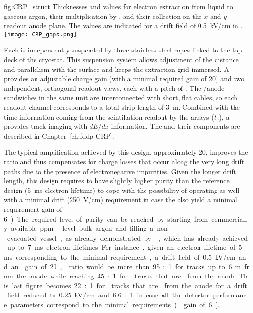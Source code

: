 \begin{dunefigure}{fig:CRP_struct}
{Thicknesses and  values for electron extraction from liquid to gaseous argon, their  multiplication by , and their collection on the $x$ and $y$ readout anode plane. The  values are indicated for a drift field of \SI{0.5}{kV/cm} in .}
\texttt{[image: CRP\_gaps.png]}
\end{dunefigure}

Each  is independently suspended by three stainless-steel ropes linked to the top deck of the cryostat. This suspension system allows adjustment of the  distance and parallelism with the  surface and keeps the extraction grid immersed. A  provides an adjustable charge gain (with a minimal required gain of \num{20}) and two independent, orthogonal readout views, each with a pitch of \dpstrippitch.  The /anode sandwiches  in the same  unit are interconnected with short, flat cables, so each readout channel corresponds to a total strip length of \SI{3}{m}. Combined with the time information coming from the  scintillation readout by the  arrays ($t_0$), a  provides \threed track imaging with $dE/dx$ information.  The  and their components are described in Chapter~\ref{ch:fddp-CRP}.

The typical amplification achieved by this design, approximately 20, improves the  ratio and thus compensates for charge losses that occur along the very long drift paths due to the presence of  electronegative impurities. Given the longer drift length, this design requires  to have slightly higher purity than the reference design  (\SI{5}{ms} electron lifetime) to cope with the possibility of operating as well with a minimal drift \efield (\SI{250}{V/cm}) requirement in case the  also yield a minimal requirement gain of \SI{6}). The required level of purity can be reached by starting from  commercially available ppm-level bulk argon and filling a non-evacuated vessel, as already demonstrated by , which has already achieved up to \SI{7}{ms} electron lifetimes.

For instance, given an electron lifetime of \SI{5}{ms} corresponding to the minimal requirement,  a drift field of \SI{0.5}{kV/cm} and an  gain of \num{20},  ratio would be more than  \num{95}:\num{1} for tracks up to \SI{6}{m} from the anode while reaching  \num{45}:\num{1} for   tracks that are \dpmaxdrift from the anode. This last figure becomes  \num{22}:\num{1} for   tracks that are \dpmaxdrift from the anode for a drift field reduced to  \SI{0.25}{kV/cm} and \num{6.6}:\num{1} in case all the detector performance parameters correspond to the minimal requirements ( gain of  \SI{6}).

